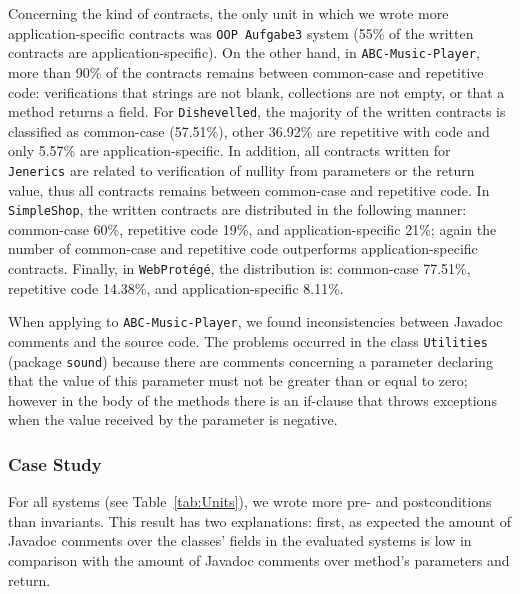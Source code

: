 
Concerning the kind of contracts, the only unit in which we wrote more
application-specific contracts was \texttt{OOP Aufgabe3} system (55\% of the
written contracts are application-specific). On the other hand, in \texttt{ABC-Music-Player}, more than 90\% of the contracts remains between common-case and
repetitive code: verifications that strings are not blank, collections are not
empty, or that a method returns a field.
For \texttt{Dishevelled}, the majority of the written contracts is classified as common-case
(57.51\%), other 36.92\% are repetitive with code and only 5.57\% are application-specific.
In addition, all contracts written for \texttt{Jenerics} are related to
verification of nullity from parameters or the return value, thus all contracts
remains between common-case and repetitive code. In \texttt{SimpleShop}, the
written contracts are distributed in the following manner: common-case 60\%, repetitive code 19\%, and application-specific 21\%; again the number of common-case and repetitive code outperforms application-specific contracts. Finally,
in \texttt{WebProt\'{e}g\'{e}}, the distribution is: common-case 77.51\%, repetitive code 14.38\%, and application-specific 8.11\%.  

When applying \contractjdoc{} to \texttt{ABC-Music-Player}, we found inconsistencies between Javadoc
comments and the source code. The problems occurred in the class \texttt{Utilities} (package
\texttt{sound}) because there are comments concerning a parameter declaring that the value of
this parameter must not be greater than or equal to zero; however in the body of the methods there
is an if-clause that throws exceptions when the value received by the parameter is negative.

\subsubsection{Case Study}
\label{sec:caseStudyDiscussion}

For all systems (see Table~\ref{tab:Units}), we
wrote more pre- and postconditions than invariants. This result has two
explanations: first, as expected the amount of Javadoc comments over the
classes' fields in the evaluated systems is low in comparison with the amount
of Javadoc comments over method's parameters and return.


